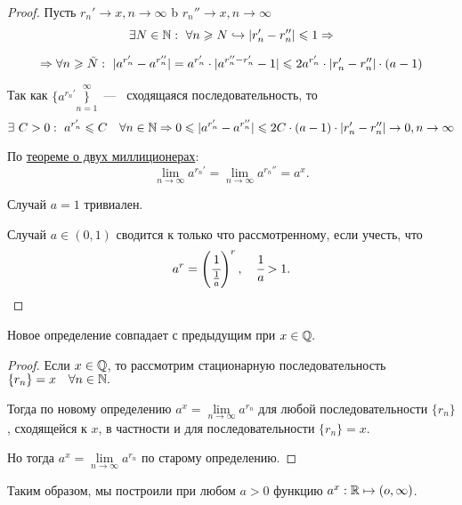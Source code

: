 \begin{proof}
    Пусть $r_{n}' \to x, n \to \infty$ b $r_{n}'' \to x, n \to \infty$
    $$
    \exists N \in \mathbb{N}: \  \forall n \geqslant N \hookrightarrow |r_{n}' - r_{n}''| \leqslant 1 \Rightarrow
    $$
    
    $$
     \Rightarrow \forall n \geq \Tilde{N}: \ |a^{r_{n}'} - a^{r_{n}''}| = a^{r_{n}'} \cdot |a^{r_{n}'' - r_{n}'} - 1| \leq 2a^{r_{n}'} \cdot |r_{n}' - r_{n}''| \cdot (a-1)
    $$

    Так как $\{a^{r_{n}'}\}\limits_{n = 1}^{\infty}$~---~ сходящаяся последовательность, то
    $$
    \exists\  C> 0: \ a^{r_{n}'} \leqslant C \quad \forall n \in \mathbb{N} \Rightarrow 0 \leqslant |a^{r_{n}'} - a^{r_{n}''}| \leqslant 2C \cdot (a-1) \cdot |r_{n}' - r_{n}''| \to 0, n \to \infty
    $$

    По \hyperlink{thm2.4}{теореме о двух миллиционерах}: $$\lim\limits_{n \to \infty} a^{r_{n}'} = \lim\limits_{n \to \infty} a^{r_{n}''} = a^{x}.
    $$

    Случай $a = 1$ тривиален.

    Случай $a \in (0, 1)$ сводится к только что рассмотренному, если учесть, что 
    $$a^{r} = \left(\cfrac{1}{\frac{1}{a}}\right)^r, \quad \cfrac{1}{a} > 1.$$
\end{proof}

\begin{lemma}
    Новое определение совпадает с предыдущим при $x \in \mathbb{Q}.$
\end{lemma}
\begin{proof}
    Если $x \in \mathbb{Q}$, то рассмотрим стационарную последовательность \\
    $\{r_{n}\} = x \quad \forall n \in \mathbb{N}.$

    Тогда по новому определению $a^x = \lim\limits_{n \to \infty} a^{r_{n}}$ для любой последовательности $\{r_{n}\}$, сходящейся к $x$, в частности и для последовательности  $\{r_{n}\} = x$.

    Но тогда $a^x = \lim\limits_{n \to \infty} a^{r_{n}}$ по старому определению.
\end{proof}

    Таким образом, мы построили при любом $a > 0$ функцию $a^{x}: \mathbb{R} \mapsto (o, \infty)$.
    
